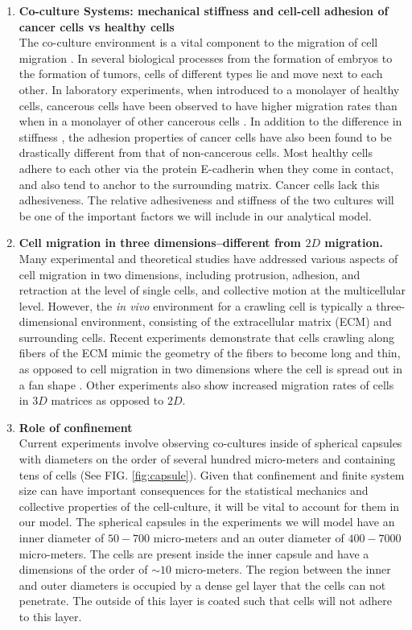 \documentclass[aps,prb,twocolumn,groupedaddress,nofootinbib,floatfix]{revtex4}
\begin{document}
\begin{enumerate}

\item {\bf Co-culture Systems: mechanical stiffness and cell-cell adhesion of cancer cells vs healthy cells}\\
The co-culture environment is a vital component to the migration of cell migration \cite{Miki}.
In several biological processes from the formation of embryos to the formation of tumors, cells of different types lie and move next to each other.
In laboratory experiments, when introduced to a monolayer of healthy cells, cancerous cells have been observed to have higher migration rates than when in a monolayer of other cancerous cells \cite{Lee}.
In addition to the difference in stiffness \cite{Lee}, the adhesion properties of cancer cells have also been found to be drastically different from that of non-cancerous cells\cite{Jeanes}.
Most healthy cells adhere to each other via the protein E-cadherin when they come in contact, and also tend to anchor to the surrounding matrix.
Cancer cells lack this adhesiveness.
The relative adhesiveness and stiffness of the two cultures will be one of the important factors we will include in our analytical model.

\item {\bf Cell migration in three dimensions--different from $2D$ migration.}\\
Many experimental and theoretical studies have addressed various aspects of cell migration in two dimensions, including protrusion, adhesion, and retraction at the level of single cells, and collective motion at the multicellular level.
However, the {\it in vivo} environment for a crawling cell is typically a three-dimensional environment, consisting of the extracellular matrix (ECM) and surrounding cells.
Recent experiments demonstrate that cells crawling along fibers of the ECM mimic the geometry of the fibers to become long and thin, as opposed to cell migration in two dimensions where the cell is spread out in a fan shape \cite{Doyle}.
Other experiments also show increased migration rates of cells in $3D$ matrices as opposed to  $2D$\cite{Cukierman}.

\item{\bf Role of confinement}\\
Current experiments involve observing co-cultures inside of spherical capsules with diameters on the order of several hundred micro-meters and containing tens of cells\cite{Alessandri} (See FIG. \ref{fig:capsule}).
Given that confinement and finite system size can have important consequences for the statistical mechanics and collective properties of the cell-culture, it will be vital to account for them in our model.
The spherical capsules in the experiments we will model have an inner diameter of $50-700$ micro-meters and an outer diameter of $400-7000$ micro-meters.
The cells are present inside the inner capsule and have a dimensions of the order of $\sim 10$ micro-meters.
The region between the inner and outer diameters is occupied by a dense gel layer that the cells can not penetrate.
The outside of this layer is coated such that cells will not adhere to this layer. 


\end{enumerate}
\end{document}
